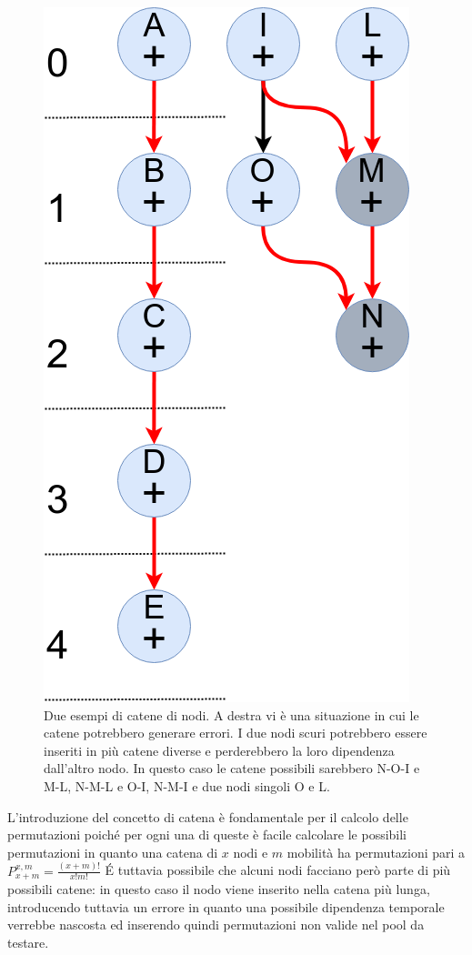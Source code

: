 \documentclass[]{IEEEtran}
\begin{document}
\begin{figure}[htp]
	\centering
	\includegraphics[height=0.25\textheight]{images/chains.png}
	\caption{Due esempi di catene di nodi. A destra vi è una situazione in cui le catene potrebbero generare errori. I due nodi scuri potrebbero essere inseriti in più catene diverse e perderebbero la loro dipendenza dall'altro nodo. In questo caso le catene possibili sarebbero N-O-I e M-L, N-M-L e O-I, N-M-I e due nodi singoli O e L. }
\end{figure}

L'introduzione del concetto di catena è fondamentale per il calcolo delle permutazioni poiché per ogni una di queste è facile calcolare le possibili permutazioni in quanto una catena di $x$ nodi e $m$ mobilità ha permutazioni pari a $P_{x+m}^{x,m} = \frac{(x+m)!}{x!m!}$
\'E tuttavia possibile che alcuni nodi facciano però parte di più possibili catene: in questo caso il nodo viene inserito nella catena più lunga, introducendo tuttavia un errore in quanto una possibile dipendenza temporale verrebbe nascosta ed inserendo quindi permutazioni non valide nel pool da testare.
\end{document}
